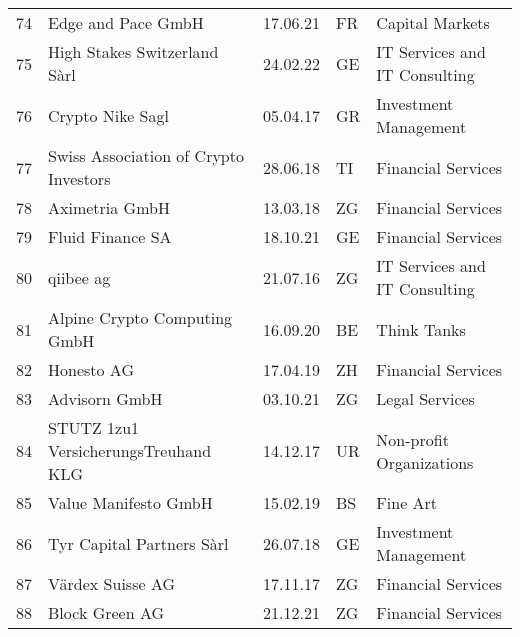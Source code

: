 \begin{tabular}{lllll}
74  &                                 Edge and Pace GmbH &      17.06.21 &     FR &                                Capital Markets \\
75  &                       High Stakes Switzerland Sàrl &      24.02.22 &     GE &                  IT Services and IT Consulting \\
76  &                                   Crypto Nike Sagl &      05.04.17 &     GR &                          Investment Management \\
77  &              Swiss Association of Crypto Investors &      28.06.18 &     TI &                             Financial Services \\
78  &                                     Aximetria GmbH &      13.03.18 &     ZG &                             Financial Services \\
79  &                                   Fluid Finance SA &      18.10.21 &     GE &                             Financial Services \\
80  &                                          qiibee ag &      21.07.16 &     ZG &                  IT Services and IT Consulting \\
81  &                       Alpine Crypto Computing GmbH &      16.09.20 &     BE &                                    Think Tanks \\
82  &                                         Honesto AG &      17.04.19 &     ZH &                             Financial Services \\
83  &                                      Advisorn GmbH &      03.10.21 &     ZG &                                 Legal Services \\
84  &               STUTZ 1zu1 VersicherungsTreuhand KLG &      14.12.17 &     UR &                       Non-profit Organizations \\
85  &                               Value Manifesto GmbH &      15.02.19 &     BS &                                       Fine Art \\
86  &                          Tyr Capital Partners Sàrl &      26.07.18 &     GE &                          Investment Management \\
87  &                                   Värdex Suisse AG &      17.11.17 &     ZG &                             Financial Services \\
88  &                                     Block Green AG &      21.12.21 &     ZG &                             Financial Services \\

\end{tabular}
